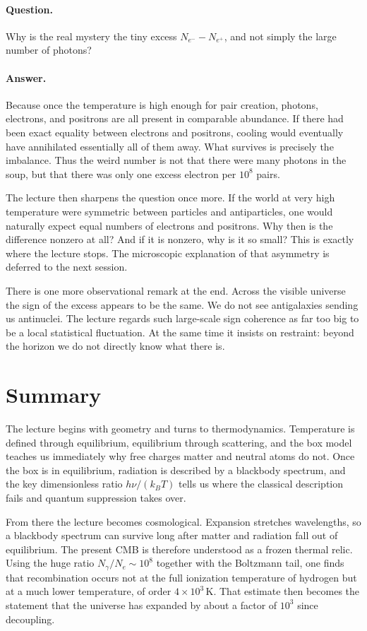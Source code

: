 \paragraph{Question.} Why is the real mystery the tiny excess \(N_{e^-}-N_{e^+}\), and not simply the large number of photons?

\paragraph{Answer.} Because once the temperature is high enough for pair creation, photons, electrons, and positrons are all present in comparable abundance. If there had been exact equality between electrons and positrons, cooling would eventually have annihilated essentially all of them away. What survives is precisely the imbalance. Thus the weird number is not that there were many photons in the soup, but that there was only one excess electron per \(10^8\) pairs.

The lecture then sharpens the question once more. If the world at very high temperature were symmetric between particles and antiparticles, one would naturally expect equal numbers of electrons and positrons. Why then is the difference nonzero at all? And if it is nonzero, why is it so small? This is exactly where the lecture stops. The microscopic explanation of that asymmetry is deferred to the next session.

There is one more observational remark at the end. Across the visible universe the sign of the excess appears to be the same. We do not see antigalaxies sending us antinuclei. The lecture regards such large-scale sign coherence as far too big to be a local statistical fluctuation. At the same time it insists on restraint: beyond the horizon we do not directly know what there is.

\section{Summary}

The lecture begins with geometry and turns to thermodynamics. Temperature is defined through equilibrium, equilibrium through scattering, and the box model teaches us immediately why free charges matter and neutral atoms do not. Once the box is in equilibrium, radiation is described by a blackbody spectrum, and the key dimensionless ratio \(h\nu/(k_B T)\) tells us where the classical description fails and quantum suppression takes over.

From there the lecture becomes cosmological. Expansion stretches wavelengths, so a blackbody spectrum can survive long after matter and radiation fall out of equilibrium. The present CMB is therefore understood as a frozen thermal relic. Using the huge ratio \(N_\gamma/N_e \sim 10^8\) together with the Boltzmann tail, one finds that recombination occurs not at the full ionization temperature of hydrogen but at a much lower temperature, of order \(4\times 10^3\,\mathrm{K}\). That estimate then becomes the statement that the universe has expanded by about a factor of \(10^3\) since decoupling.

